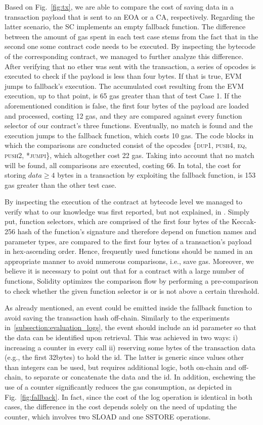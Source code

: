 Based on Fig.~\ref{fig:tx}, we are able to compare the cost of saving data in a transaction payload that is sent to an EOA or a CA, respectively. Regarding the latter scenario, the SC implements an empty fallback function. The difference between the amount of gas spent in each test case stems from the fact that in the second one some contract code needs to be executed. By inspecting the bytecode of the corresponding contract, we managed to further analyze this difference. After verifying that no ether was sent with the transaction, a series of opcodes is executed to check if the payload is less than four bytes. If that is true, EVM jumps to fallback’s execution. The accumulated cost resulting from the EVM execution, up to that point, is 65 gas greater than that of test Case 1. If the aforementioned condition is false, the first four bytes of the payload are loaded and processed, costing 12 gas, and they are compared against every function selector of our contract’s three functions. Eventually, no match is found and the execution jumps to the fallback function, which costs 10 gas. The code blocks in which the comparisons are conducted consist of the opcodes \textsc{\{dup1, push4, eq, push2, *jumpi\}}, which altogether cost 22 gas. Taking into account that no match will be found, all comparisons are executed, costing 66. In total, the cost for storing \(data\geqslant 4\) bytes in a transaction by exploiting the fallback function, is 153 gas greater than the other test case.


By inspecting the execution of the contract at bytecode level we managed to verify what to our knowledge was first reported, but not explained, in \citep{chen_2018}. Simply put, function selectors, which are comprised of the first four bytes of the Keccak-256 hash of the function's signature and therefore depend on function names and parameter types, are compared to the first four bytes of a transaction’s payload in hex-ascending order. Hence, frequently used functions should be named in an appropriate manner to avoid numerous comparisons, i.e., save gas. Moreover, we believe it is necessary to point out that for a contract with a large number of functions, Solidity optimizes the comparison flow by performing a pre-comparison to check whether the given function selector is or is not above a certain threshold.

As already mentioned, an event could be emitted inside the fallback function to avoid saving the transaction hash off-chain. Similarly to the experiments in~\ref{subsection:evaluation_logs}, the event should include an id parameter so that the data can be identified upon retrieval. This was achieved in two ways: i) increasing a counter in every call ii) reserving some bytes of the transaction data (e.g., the first 32bytes) to hold the id. The latter is generic since values other than integers can be used, but requires additional logic, both on-chain and off-chain, to separate or concatenate the data and the id. In addition, eschewing the use of a counter significantly reduces the gas consumption, as depicted in Fig.~\ref{fig:fallback}. In fact, since the cost of the log operation is identical in both cases, the difference in the cost depends solely on the need of updating the counter, which involves two SLOAD and one SSTORE operations.

